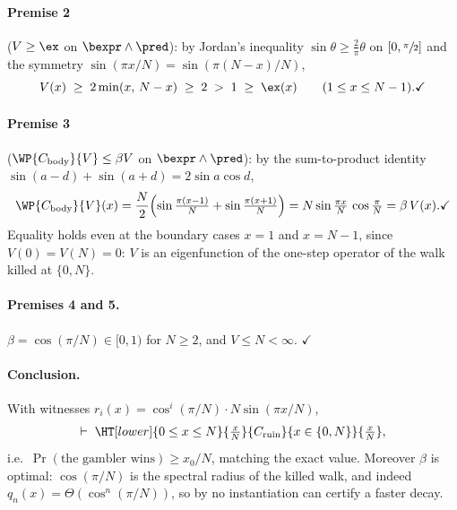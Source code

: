 \paragraph{Premise 2} ($V \geq \ex$ on $\bexpr\land\pred$):
by Jordan's inequality $\sin\theta \geq \tfrac{2}{\pi}\theta$ on
$[0,\sfrac{\pi}{2}]$ and the symmetry
$\sin(\pi x/N) = \sin(\pi(N-x)/N)$,
\[
  V(x) \;\geq\; 2\min(x,\,N-x) \;\geq\; 2 \;>\; 1 \;\geq\; \ex(x)
  \qquad (1 \leq x \leq N-1).
  \checkmark
\]

\paragraph{Premise 3} ($\WP{C_{\text{body}}}{V} \leq \beta V$ on
$\bexpr\land\pred$): by the sum-to-product identity
$\sin(a-d) + \sin(a+d) = 2\sin a \cos d$,
\[
  \WP{C_{\text{body}}}{V}(x)
  = \frac{N}{2}\Bigl(\sin\tfrac{\pi(x-1)}{N} + \sin\tfrac{\pi(x+1)}{N}\Bigr)
  = N\sin\tfrac{\pi x}{N}\,\cos\tfrac{\pi}{N}
  = \beta\, V(x).
  \checkmark
\]
Equality holds even at the boundary cases $x = 1$ and $x = N-1$, since
$V(0) = V(N) = 0$: $V$ is an eigenfunction of the one-step operator of the
walk killed at $\{0, N\}$.

\paragraph{Premises 4 and 5.}
$\beta = \cos(\pi/N) \in [0,1)$ for $N \geq 2$, and $V \leq N \lt \infty$.
$\checkmark$

\paragraph{Conclusion.}
With witnesses $r_i(x) = \cos^i(\pi/N)\cdot N\sin(\pi x/N)$,
\[
  \vdash\; \HT[lower]{0 \leq x \leq N}{\tfrac{x}{N}}
     {C_{\text{ruin}}}{x \in \{0,N\}}{\tfrac{x}{N}},
\]
i.e.\ $\Pr(\text{the gambler wins}) \geq x_0/N$, matching the exact value.
Moreover $\beta$ is optimal: $\cos(\pi/N)$ is the spectral radius of the
killed walk, and indeed $q_n(x) = \Theta(\cos^n(\pi/N))$, so by
 no instantiation can certify a faster decay.

